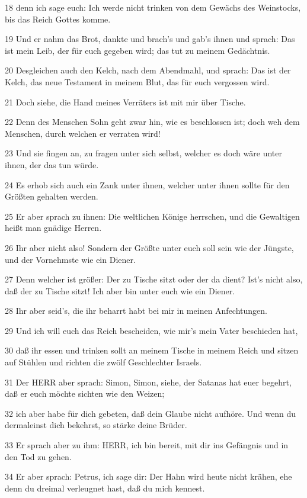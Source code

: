 \par 18 denn ich sage euch: Ich werde nicht trinken von dem Gewächs des Weinstocks, bis das Reich Gottes komme.
\par 19 Und er nahm das Brot, dankte und brach's und gab's ihnen und sprach: Das ist mein Leib, der für euch gegeben wird; das tut zu meinem Gedächtnis.
\par 20 Desgleichen auch den Kelch, nach dem Abendmahl, und sprach: Das ist der Kelch, das neue Testament in meinem Blut, das für euch vergossen wird.
\par 21 Doch siehe, die Hand meines Verräters ist mit mir über Tische.
\par 22 Denn des Menschen Sohn geht zwar hin, wie es beschlossen ist; doch weh dem Menschen, durch welchen er verraten wird!
\par 23 Und sie fingen an, zu fragen unter sich selbst, welcher es doch wäre unter ihnen, der das tun würde.
\par 24 Es erhob sich auch ein Zank unter ihnen, welcher unter ihnen sollte für den Größten gehalten werden.
\par 25 Er aber sprach zu ihnen: Die weltlichen Könige herrschen, und die Gewaltigen heißt man gnädige Herren.
\par 26 Ihr aber nicht also! Sondern der Größte unter euch soll sein wie der Jüngste, und der Vornehmste wie ein Diener.
\par 27 Denn welcher ist größer: Der zu Tische sitzt oder der da dient? Ist's nicht also, daß der zu Tische sitzt! Ich aber bin unter euch wie ein Diener.
\par 28 Ihr aber seid's, die ihr beharrt habt bei mir in meinen Anfechtungen.
\par 29 Und ich will euch das Reich bescheiden, wie mir's mein Vater beschieden hat,
\par 30 daß ihr essen und trinken sollt an meinem Tische in meinem Reich und sitzen auf Stühlen und richten die zwölf Geschlechter Israels.
\par 31 Der HERR aber sprach: Simon, Simon, siehe, der Satanas hat euer begehrt, daß er euch möchte sichten wie den Weizen;
\par 32 ich aber habe für dich gebeten, daß dein Glaube nicht aufhöre. Und wenn du dermaleinst dich bekehrst, so stärke deine Brüder.
\par 33 Er sprach aber zu ihm: HERR, ich bin bereit, mit dir ins Gefängnis und in den Tod zu gehen.
\par 34 Er aber sprach: Petrus, ich sage dir: Der Hahn wird heute nicht krähen, ehe denn du dreimal verleugnet hast, daß du mich kennest.
